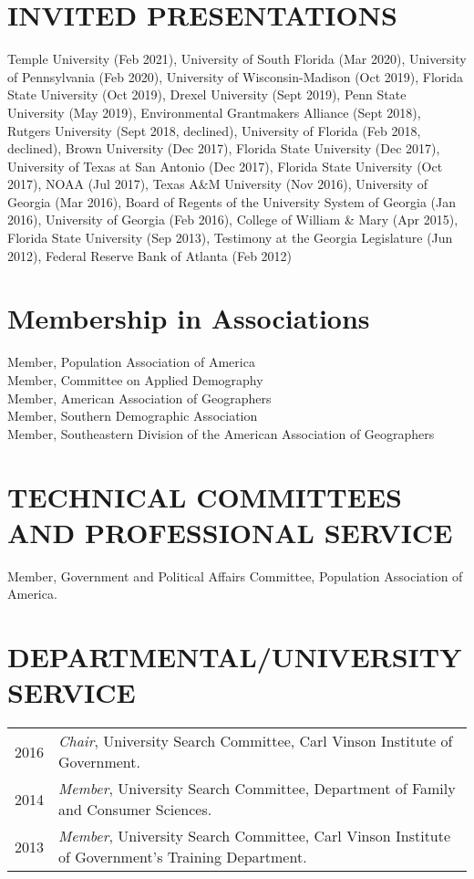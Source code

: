 \documentclass[letterpaper,11pt]{article}
\begin{document}
\section{INVITED PRESENTATIONS}
Temple University (Feb 2021), University of South Florida (Mar 2020), University of Pennsylvania (Feb 2020), University of Wisconsin-Madison (Oct 2019), Florida State University (Oct 2019), Drexel University (Sept 2019), Penn State University (May 2019), Environmental Grantmakers Alliance (Sept 2018), Rutgers University (Sept 2018, declined), University of Florida (Feb 2018, declined), Brown University (Dec 2017), Florida State University (Dec 2017), University of Texas at San Antonio (Dec 2017), Florida State University (Oct 2017), NOAA (Jul 2017), Texas A\&M University (Nov 2016), University of Georgia (Mar 2016), Board of Regents of the University System of Georgia (Jan 2016), University of Georgia (Feb 2016), College of William \& Mary (Apr 2015), Florida State University (Sep 2013), Testimony at the Georgia Legislature (Jun 2012), Federal Reserve Bank of Atlanta (Feb 2012)

\section{Membership in Associations}
Member, Population Association of America\\
Member, Committee on Applied Demography\\
Member, American Association of Geographers\\
Member, Southern Demographic Association\\
Member, Southeastern Division of the American Association of Geographers

\section{TECHNICAL COMMITTEES AND PROFESSIONAL SERVICE}
Member, Government and Political Affairs Committee, Population Association of America.
% 


\section{DEPARTMENTAL/UNIVERSITY SERVICE}
\begin{tabularx}{\linewidth}{lX}
2016 & \textit{Chair}, University Search Committee, Carl Vinson Institute of Government.\\
2014 & \textit{Member}, University Search Committee, Department of Family and Consumer Sciences.\\
2013 & \textit{Member}, University Search Committee, Carl Vinson Institute of Government's Training Department.\\
\end{tabularx}
\end{document}
